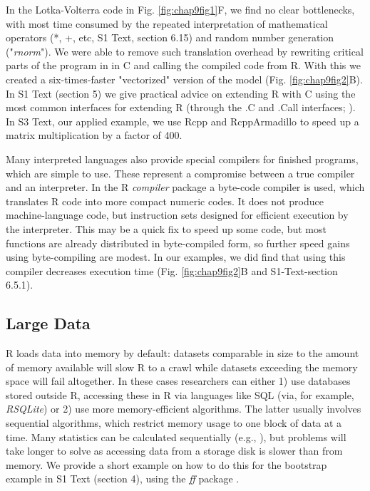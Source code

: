 \documentclass[b5paper,justified]{tufte-book} %
\begin{document}
\begin{fullwidth}
In the Lotka-Volterra code in Fig. \ref{fig:chap9fig1}F, we find no clear bottlenecks, with most time consumed by the repeated interpretation of mathematical operators (*, +, etc, S1 Text, section 6.15) and random number generation ("\emph{rnorm}"). We were able to remove such translation overhead by rewriting critical parts of the program in in C and calling the compiled code from R. With this we created a six-times-faster "vectorized" version of the model (Fig. \ref{fig:chap9fig2}B). In S1 Text (section 5) we give practical advice on extending R with C using the most common interfaces for extending R (through the .C and .Call interfaces; \citealt{Schmidberger2009}). In S3 Text, our applied example, we use Rcpp \citep{Eddelbuettel2011} and RcppArmadillo \citep{Eddelbuettel2013} to speed up a matrix multiplication by a factor of 400.

Many interpreted languages also provide special compilers for finished programs, which are simple to use. These represent a compromise between a true compiler and an interpreter. In the R \emph{compiler} package a byte-code compiler is used, which translates R code into more compact numeric codes. It does not produce machine-language code, but instruction sets designed for efficient execution by the interpreter. This may be a quick fix to speed up some code, but most functions are already distributed in byte-compiled form, so further speed gains using byte-compiling are modest. In our examples, we did find that using this compiler decreases execution time (Fig. \ref{fig:chap9fig2}B and S1-Text-section 6.5.1).

\subsection{Large Data}
R loads data into memory by default: datasets comparable in size to the amount of memory available will slow R to a crawl while datasets exceeding the memory space will fail altogether. In these cases researchers can either 1) use databases stored outside R, accessing these in R via languages like SQL (via, for example, \emph{RSQLite}) or 2) use more memory-efficient algorithms. The latter usually involves sequential algorithms, which restrict memory usage to one block of data at a time. Many statistics can be calculated sequentially (e.g., \citealt{Robbins1951}), but problems will take longer to solve as accessing data from a storage disk is slower than from memory. We provide a short example on how to do this for the bootstrap example in S1 Text (section 4), using the \textit{ff} package \citep{Adler2014}.


\end{fullwidth}
\end{document}

